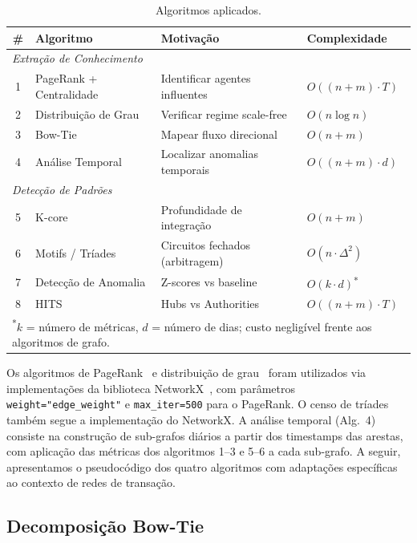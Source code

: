 \documentclass[12pt,a4paper]{article}
\begin{document}
\begin{table}[H]
\centering
\caption{Algoritmos aplicados.}
\label{tab:algoritmos}
\small
\begin{tabular}{clll}
\toprule
\# & Algoritmo & Motivação & Complexidade \\
\midrule
\multicolumn{4}{l}{\textit{Extração de Conhecimento}} \\
1 & PageRank + Centralidade & Identificar agentes influentes & $O((n+m) \cdot T)$ \\
2 & Distribuição de Grau    & Verificar regime scale-free    & $O(n \log n)$ \\
3 & Bow-Tie                 & Mapear fluxo direcional        & $O(n+m)$ \\
4 & Análise Temporal         & Localizar anomalias temporais  & $O((n+m) \cdot d)$ \\
\midrule
\multicolumn{4}{l}{\textit{Detecção de Padrões}} \\
5 & K-core                  & Profundidade de integração     & $O(n+m)$ \\
6 & Motifs / Tríades        & Circuitos fechados (arbitragem)& $O(n \cdot \Delta^2)$ \\
7 & Detecção de Anomalia    & Z-scores vs baseline           & $O(k \cdot d)$\textsuperscript{*} \\
8 & HITS                    & Hubs vs Authorities            & $O((n+m) \cdot T)$ \\
\bottomrule
\multicolumn{4}{l}{\footnotesize \textsuperscript{*}$k$ = número de métricas, $d$ = número de dias; custo negligível frente aos algoritmos de grafo.}
\end{tabular}
\end{table}

Os algoritmos de PageRank~\cite{page1999} e distribuição de grau~\cite{barabasi1999} foram utilizados via implementações da biblioteca NetworkX~\cite{networkx}, com parâmetros \texttt{weight="edge\_weight"} e \texttt{max\_iter=500} para o PageRank. O censo de tríades também segue a implementação do NetworkX. A análise temporal (Alg.~4) consiste na construção de sub-grafos diários a partir dos timestamps das arestas, com aplicação das métricas dos algoritmos 1--3 e 5--6 a cada sub-grafo. A seguir, apresentamos o pseudocódigo dos quatro algoritmos com adaptações específicas ao contexto de redes de transação.

\subsection{Decomposição Bow-Tie}
\end{document}
